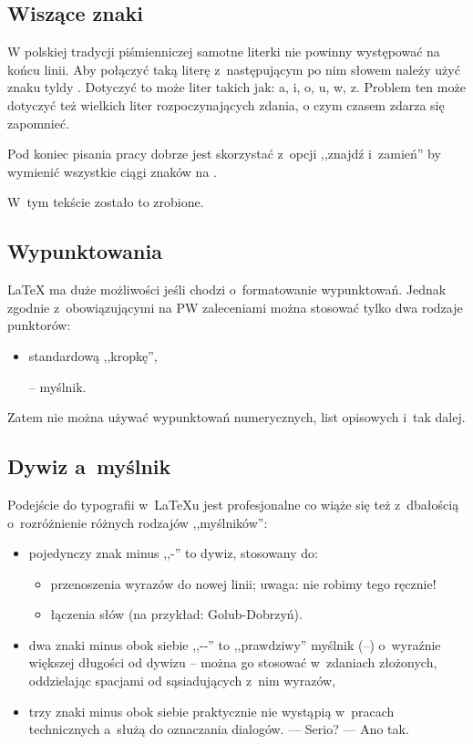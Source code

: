 \subsection{Wiszące znaki}
W polskiej tradycji piśmienniczej samotne literki nie powinny występować na końcu linii. Aby połączyć taką literę z~następującym po nim słowem należy użyć znaku tyldy \keys{\textasciitilde{}}. Dotyczyć to może liter takich jak: a, i, o, u, w, z. Problem ten może dotyczyć też wielkich liter rozpoczynających zdania, o czym czasem zdarza się zapomnieć.


Pod koniec pisania pracy dobrze jest skorzystać z~opcji ,,znajdź i~zamień'' by wymienić wszystkie ciągi znaków  na .

W~tym tekście zostało to zrobione.

\subsection{Wypunktowania}
\LaTeX{} ma duże możliwości jeśli chodzi o~formatowanie wypunktowań. Jednak zgodnie z~obowiązującymi na PW zaleceniami można stosować tylko dwa rodzaje punktorów:
\begin{itemize}
    \item standardową ,,kropkę'',
    \item[--] myślnik.
\end{itemize}
Zatem nie można używać wypunktowań numerycznych, list opisowych i~tak dalej.


\subsection{Dywiz a~myślnik}
Podejście do typografii w~\LaTeX{u} jest profesjonalne co wiąże się też z~dbałością o~rozróżnienie różnych rodzajów ,,myślników'':
\begin{itemize}
    \item pojedynczy znak minus ,,-'' to dywiz, stosowany do:
    \begin{itemize}
        \item przenoszenia wyrazów do nowej linii; uwaga: nie robimy tego ręcznie!
        \item łączenia słów (na przykład: Golub-Dobrzyń).
    \end{itemize}
    \item dwa znaki minus obok siebie ,,-{}-'' %
    to ,,prawdziwy'' myślnik (--) o~wyraźnie większej długości od dywizu -- można go stosować w~zdaniach złożonych, oddzielając spacjami od sąsiadujących z~nim wyrazów,
    \item trzy znaki minus obok siebie praktycznie nie wystąpią w~pracach technicznych a~służą do oznaczania dialogów. --- Serio? --- Ano tak.
\end{itemize}


